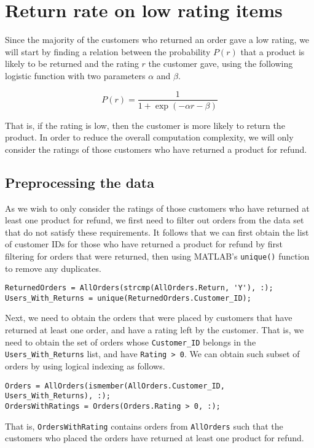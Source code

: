 \newpage
\section{Return rate on low rating items}
Since the majority of the customers who returned an order gave a low rating, we will start by finding a relation between the probability $P(r)$ that a product is likely to be returned and the rating $r$ the customer gave, using the following logistic function with two parameters $\alpha$ and $\beta$.

$$P(r) = \frac{1}{1 + \exp(-\alpha r - \beta)}$$

\noindent
That is, if the rating is low, then the customer is more likely to return the product. In order to reduce the overall computation complexity, we will only consider the ratings of those customers who have returned a product for refund.

\subsection{Preprocessing the data}
As we wish to only consider the ratings of those customers who have returned at least one product for refund, we first need to filter out orders from the data set that do not satisfy these requirements. It follows that we can first obtain the list of customer IDs for those who have returned a product for refund by first filtering for orders that were returned, then using MATLAB's \lstinline|unique()| function to remove any duplicates.

\begin{lstlisting}
ReturnedOrders = AllOrders(strcmp(AllOrders.Return, 'Y'), :);
Users_With_Returns = unique(ReturnedOrders.Customer_ID);
\end{lstlisting}

\noindent
Next, we need to obtain the orders that were placed by customers that have returned at least one order, and have a rating left by the customer. That is, we need to obtain the set of orders whose \lstinline|Customer_ID| belongs in the \lstinline|Users_With_Returns| list, and have \lstinline|Rating > 0|. We can obtain such subset of orders by using logical indexing as follows.

\begin{lstlisting}
Orders = AllOrders(ismember(AllOrders.Customer_ID, Users_With_Returns), :);
OrdersWithRatings = Orders(Orders.Rating > 0, :);
\end{lstlisting}

\noindent
That is, \lstinline|OrdersWithRating| contains orders from \lstinline|AllOrders| such that the customers who placed the orders have returned at least one product for refund.

